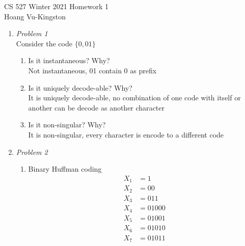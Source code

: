 \documentclass[12pt]{article}
\begin{document}
CS 527 Winter 2021 \hfill Homework 1\\
Hoang Vu-Kingston

\hrulefill

\begin{enumerate}
	\item\textit{Problem 1}\\
    Consider the code $\{0,01\}$
    \begin{enumerate}
        \item Is it instantaneous? Why?\\
        Not instantaneous, 01 contain 0 as prefix
        \item Is it uniquely decode-able? Why?\\
        It is uniquely decode-able, no combination of one code with itself or another can be decode as another character
        \item Is it non-singular? Why?\\
        It is non-singular, every character is encode to a different code
    \end{enumerate}
    \item\textit{Problem 2}\\
    \begin{enumerate}
        \item Binary Huffman coding\\
        \begin{align*}
            X_1 &= 1\\
            X_2 &= 00\\
            X_3 &= 011\\
            X_4 &= 01000\\
            X_5 &= 01001\\
            X_6 &= 01010\\
            X_7 &= 01011\\
        \end{align*}
        \noindent

\end{enumerate}
\end{enumerate}
\end{document}
